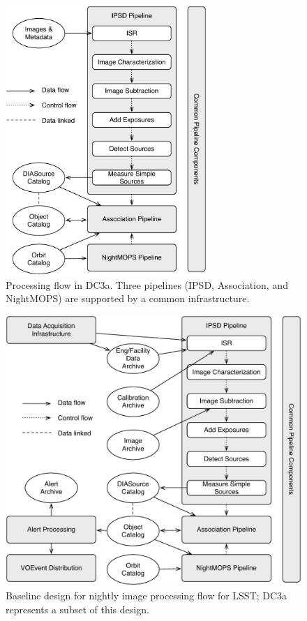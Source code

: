 \begin{itemize}
\begin{figure}[t]
\begin{center}
\includegraphics[width=3in]{images/DC3aNightly.pdf}
\caption{Processing flow in DC3a. Three pipelines (IPSD, Association, and
NightMOPS) are supported by a common infrastructure.  
\label{fig:dc3apipes}}
\end{center}
\end{figure}

\begin{figure}[t]
\begin{center}
\includegraphics[width=4.5in]{images/LSSTpipes.pdf}
\caption{Baseline design for nightly image processing flow for LSST; DC3a represents
a subset of this design.  
\label{fig:lsstpipes}}
\end{center}
\end{figure}


\end{itemize}


